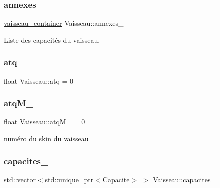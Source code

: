 \subsubsection{\texorpdfstring{annexes\+\_\+}{annexes\_}}
{\footnotesize\ttfamily \mbox{\hyperlink{def__type_8h_ad123ed7c93f42c8dd68e4af28b16b639}{vaisseau\+\_\+container}} Vaisseau\+::annexes\+\_\+\hspace{0.3cm}{\ttfamily [protected]}}



Liste des capacités du vaisseau. 

\mbox{\label{class_vaisseau_a1a64494b34aea8818a2a5f14adfcdd26}} 
\subsubsection{\texorpdfstring{atq}{atq}}
{\footnotesize\ttfamily float Vaisseau\+::atq = 0\hspace{0.3cm}{\ttfamily [protected]}}

\mbox{\label{class_vaisseau_aa2bbb11262b446da2855d90833e16297}} 
\subsubsection{\texorpdfstring{atq\+M\+\_\+}{atqM\_}}
{\footnotesize\ttfamily float Vaisseau\+::atq\+M\+\_\+ = 0\hspace{0.3cm}{\ttfamily [protected]}}



numéro du skin du vaisseau 

\mbox{\label{class_vaisseau_af6ca9930eaac09830571679bfe48a390}} 
\subsubsection{\texorpdfstring{capacites\+\_\+}{capacites\_}}
{\footnotesize\ttfamily std\+::vector$<$std\+::unique\+\_\+ptr$<$\mbox{\hyperlink{class_capacite}{Capacite}}$>$ $>$ Vaisseau\+::capacites\+\_\+\hspace{0.3cm}{\ttfamily [protected]}}


